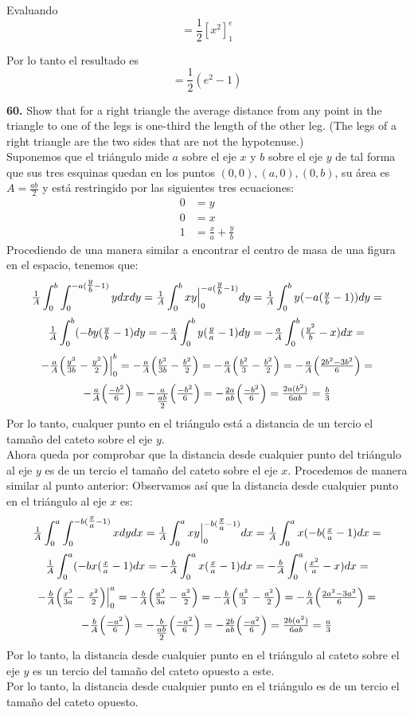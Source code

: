 \documentclass[11pt]{report}
\begin{document}
Evaluando
$$ = \frac{1}{2} \left[x^2\right]_{1}^{e}$$

Por lo tanto el resultado es
$$ = \frac{1}{2} \left(e^2 - 1\right)$$

\newpage

\textbf{60.} Show that for a right triangle the average distance from any point
in the triangle to one of the legs is one-third the length of the other leg.
(The legs of a right triangle are the two sides that are not the hypotenuse.) \\

Suponemos que el triángulo mide $a$ sobre el eje $x$ y $b$ sobre el eje $y$ de tal forma que
sus tres esquinas quedan en los puntos ${(0,0), (a,0), (0,b)}$, su área es $A= \tfrac{ab}{2}$
y está restringido por las siguientes tres ecuaciones:
\begin{align*}
	0&=y\\
	0&=x\\
	1&=\tfrac{x}{a}+\tfrac{y}{b}
\end{align*}
Procediendo de una manera similar a encontrar el centro de masa de una figura en el espacio,
tenemos que:
\[\tfrac{1}{A}\int_0^{b}\int_0^{-a(\tfrac{y}{b}-1)}ydxdy =
  \tfrac{1}{A}\int_0^{b}xy\Big|_0^{-a(\tfrac{y}{b}-1)}dy=
  \tfrac{1}{A}\int_0^{b}y(-a(\tfrac{y}{b}-1))dy=\]
\[\tfrac{1}{A}\int_0^{b}(-by(\tfrac{y}{b}-1)dy=
  -\tfrac{a}{A}\int_0^{b}y(\tfrac{y}{a}-1)dy=
  -\tfrac{a}{A}\int_0^{b}(\tfrac{y^2}{b}-x)dx=\]
\[-\tfrac{a}{A}\Big( \tfrac{y^3}{3b}-\tfrac{y^2}{2} \Big)\Big|_0^b=
  -\tfrac{a}{A}\Big( \tfrac{b^3}{3b}-\tfrac{b^2}{2} \Big)=
  -\tfrac{a}{A}\Big( \tfrac{b^2}{3}-\tfrac{b^2}{2} \Big)=
  -\tfrac{a}{A}\Big( \tfrac{2b^2-3b^2}{6} \Big)=\]
\[-\tfrac{a}{A}\Big( \tfrac{-b^2}{6} \Big)=
  -\tfrac{a}{\tfrac{ab}{2}}\Big( \tfrac{-b^2}{6} \Big)=
  -\tfrac{2a}{ab}\Big( \tfrac{-b^2}{6} \Big)=
  \tfrac{2a(b^2)}{6ab}=
  \tfrac{b}{3}
\]
Por lo tanto, cualquer punto en el triángulo está a distancia de un tercio el tamaño del
cateto sobre el eje $y$.\\
Ahora queda por comprobar que la distancia desde cualquier punto del triángulo al eje $y$
es de un tercio el tamaño del cateto sobre el eje $x$. Procedemos de manera similar al
punto anterior:
Observamos así que la distancia desde cualquier punto en el triángulo al eje $x$ es:
\[\tfrac{1}{A}\int_0^{a}\int_0^{-b(\tfrac{x}{a}-1)}xdydx =
  \tfrac{1}{A}\int_0^{a}xy\Big|_0^{-b(\tfrac{x}{a}-1)}dx=
  \tfrac{1}{A}\int_0^{a}x(-b(\tfrac{x}{a}-1)dx=\]
\[\tfrac{1}{A}\int_0^{a}(-bx(\tfrac{x}{a}-1)dx=
  -\tfrac{b}{A}\int_0^{a}x(\tfrac{x}{a}-1)dx=
  -\tfrac{b}{A}\int_0^{a}(\tfrac{x^2}{a}-x)dx=\]
\[-\tfrac{b}{A}\Big( \tfrac{x^3}{3a}-\tfrac{x^2}{2} \Big)\Big|_0^a=
  -\tfrac{b}{A}\Big( \tfrac{a^3}{3a}-\tfrac{a^2}{2} \Big)=
  -\tfrac{b}{A}\Big( \tfrac{a^2}{3}-\tfrac{a^2}{2} \Big)=
  -\tfrac{b}{A}\Big( \tfrac{2a^2-3a^2}{6} \Big)=\]
\[-\tfrac{b}{A}\Big( \tfrac{-a^2}{6} \Big)=
  -\tfrac{b}{\tfrac{ab}{2}}\Big( \tfrac{-a^2}{6} \Big)=
  -\tfrac{2b}{ab}\Big( \tfrac{-a^2}{6} \Big)=
  \tfrac{2b(a^2)}{6ab}=
  \tfrac{a}{3}
\]
Por lo tanto, la distancia desde cualquier punto en el triángulo al cateto sobre el
eje $y$ es un tercio del tamaño del cateto opuesto a este.\\
Por lo tanto, la distancia desde cualquier punto en el triángulo es de un tercio el
tamaño del cateto opuesto.\\
\end{document}
